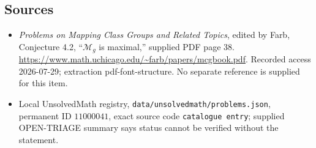 \documentclass[11pt]{article}
\begin{document}
\subsection{Sources}
\begin{itemize}
\item \emph{Problems on Mapping Class Groups and Related Topics}, edited by Farb, Conjecture 4.2, ``\(\mathcal M_g\) is maximal,'' supplied PDF page 38. \url{https://www.math.uchicago.edu/~farb/papers/mcgbook.pdf}. Recorded access 2026-07-29; extraction pdf-font-structure. No separate reference is supplied for this item.
\item Local UnsolvedMath registry, \texttt{data/unsolvedmath/problems.json}, permanent ID \(11000041\), exact source code \texttt{catalogue entry}; supplied OPEN-TRIAGE summary says status cannot be verified without the statement.
\end{itemize}
\end{document}
